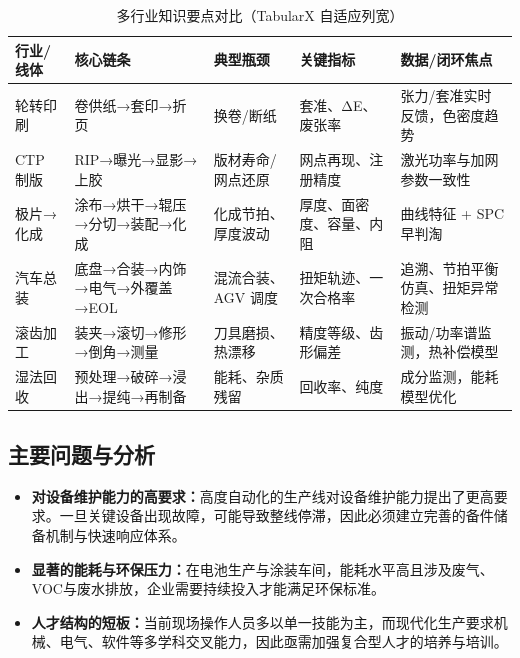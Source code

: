 \begin{table}[htbp]
\centering\small
\renewcommand{\arraystretch}{1.08}
\begin{tabularx}{\textwidth}{p{1.8cm}X p{2.2cm} p{2.4cm} X}
\toprule
行业/线体 & 核心链条 & 典型瓶颈 & 关键指标 & 数据/闭环焦点 \\
\midrule
轮转印刷 & 卷供纸→套印→折页 & 换卷/断纸 & 套准、ΔE、废张率 & 张力/套准实时反馈，色密度趋势 \\
CTP 制版 & RIP→曝光→显影→上胶 & 版材寿命/网点还原 & 网点再现、注册精度 & 激光功率与加网参数一致性 \\
极片→化成 & 涂布→烘干→辊压→分切→装配→化成 & 化成节拍、厚度波动 & 厚度、面密度、容量、内阻 & 曲线特征 + SPC 早判淘 \\
汽车总装 & 底盘→合装→内饰→电气→外覆盖→EOL & 混流合装、AGV 调度 & 扭矩轨迹、一次合格率 & 追溯、节拍平衡仿真、扭矩异常检测 \\
滚齿加工 & 装夹→滚切→修形→倒角→测量 & 刀具磨损、热漂移 & 精度等级、齿形偏差 & 振动/功率谱监测，热补偿模型 \\
湿法回收 & 预处理→破碎→浸出→提纯→再制备 & 能耗、杂质残留 & 回收率、纯度 & 成分监测，能耗模型优化 \\
\bottomrule
\end{tabularx}
\caption{多行业知识要点对比（TabularX 自适应列宽）}
\label{tab:knowledge-map}
\end{table}

\subsection{主要问题与分析}
\begin{itemize}
    \item \textbf{对设备维护能力的高要求：}高度自动化的生产线对设备维护能力提出了更高要求。一旦关键设备出现故障，可能导致整线停滞，因此必须建立完善的备件储备机制与快速响应体系。
    \item \textbf{显著的能耗与环保压力：}在电池生产与涂装车间，能耗水平高且涉及废气、VOC与废水排放，企业需要持续投入才能满足环保标准。
    \item \textbf{人才结构的短板：}当前现场操作人员多以单一技能为主，而现代化生产要求机械、电气、软件等多学科交叉能力，因此亟需加强复合型人才的培养与培训。
\end{itemize}

